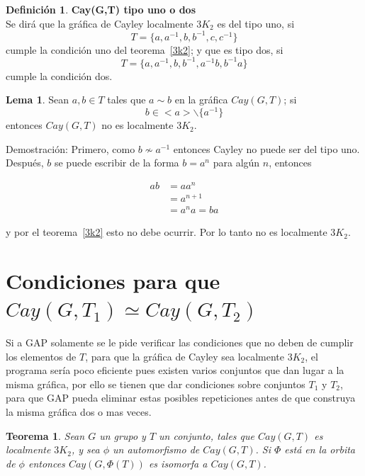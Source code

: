 \documentclass[12pt]{book}
\newtheorem{theorem}{Teorema}
\theoremstyle{definition}
\newtheorem{definition}{Definición}
\newtheorem{lemma}{Lema} \newcounter{in} \newcounter{ini}
\begin{document}
\begin{definition}\textbf{Cay(G,T) tipo uno o dos}\\
  Se dirá que la gráfica de Cayley localmente $3K_2$ es del tipo uno,
  si $$T=\{a,a^{-1},b,b^{-1},c,c^{-1} \}$$ cumple la condición uno del
  teorema~\ref{3k2}; y que es tipo dos,
  si $$T=\{a,a^{-1},b,b^{-1},a^{-1}b,b^{-1}a\}$$ cumple la condición
  dos.
\end{definition}



\begin{lemma}\label{bamnocayley}
  Sean $a,b\in T$ tales que $a\sim b$ en la gráfica $Cay(G,T)$;
  si \begin{equation*}b\in <a>\backslash \{a^{-1}\}\end{equation*}
  entonces $Cay(G,T)$ no es localmente $3K_2$.
\end{lemma}

Demostración: Primero, como $b\nsim a^{-1}$ entonces Cayley no puede
ser del tipo uno. Después, $b$ se puede escribir de la forma $b=a^n$
para algún $n$, entonces

\begin{equation*}
  \begin{split}
    ab&=aa^n\\
    &=a^{n+1}\\
    &=a^na=ba
  \end{split}
\end{equation*}

y por el teorema~\ref{3k2} esto no debe ocurrir. Por lo tanto no es
localmente $3K_2$.




\section{Condiciones para que $Cay(G,T_1)\simeq Cay(G,T_2)$}


Si a GAP solamente se le pide verificar las condiciones que no deben
de cumplir los elementos de $T$, para que la gráfica de Cayley sea
localmente $3K_2$, el programa ser\'ia poco eficiente pues existen
varios conjuntos que dan lugar a la misma gráfica, por ello se tienen
que dar condiciones sobre conjuntos $T_1$ y $T_2$, para que GAP pueda
eliminar estas posibles repeticiones antes de que construya la misma
gráfica dos o mas veces.

\begin{theorem}
  Sean $G$ un grupo y $T$ un conjunto, tales que $Cay(G,T)$ es
  localmente $3K_2$, y sea $\phi$ un automorfismo de $Cay(G,T)$. Si
  $\Phi$ está en la orbita de $\phi$ entonces $Cay(G,\Phi(T))$ es
  isomorfa a $Cay(G,T)$. \label{orbitas}
\end{theorem}
\end{document}
